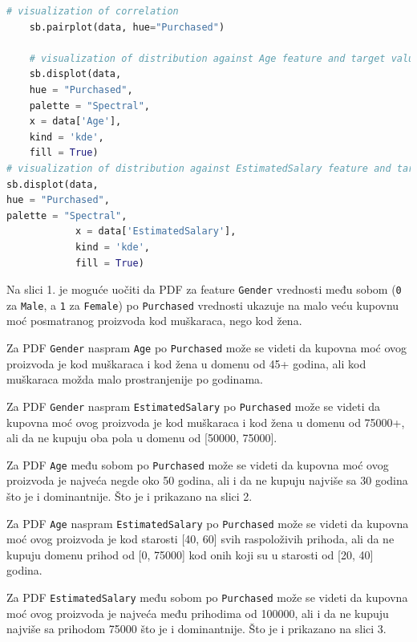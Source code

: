 \documentclass[fontsize=12bp, paper=a4]{scrarticle}
\begin{document}
\begin{lstlisting}[language=Python, caption=Navođenje načina vizuelizacija za sliku \texttt{1., 2. i 3.}]
    # visualization of correlation
    sb.pairplot(data, hue="Purchased")

    # visualization of distribution against Age feature and target value
    sb.displot(data, 
    hue = "Purchased", 
    palette = "Spectral",
    x = data['Age'],
    kind = 'kde',
    fill = True)
# visualization of distribution against EstimatedSalary feature and target value
sb.displot(data, 
hue = "Purchased", 
palette = "Spectral",
			x = data['EstimatedSalary'],
			kind = 'kde',
			fill = True)
\end{lstlisting}

Na slici 1. je moguće uočiti da PDF za feature \verb*|Gender| vrednosti među sobom (\verb|0| za \verb|Male|, a \verb*|1| za \verb*|Female|) po \verb*|Purchased| vrednosti ukazuje na malo veću kupovnu moć posmatranog proizvoda kod muškaraca, nego kod žena.

Za PDF \verb*|Gender| naspram \verb*|Age| po \verb|Purchased| može se videti da kupovna moć ovog proizvoda je kod muškaraca i kod žena u domenu od 45+ godina, ali kod muškaraca možda malo prostranjenije po godinama.

Za PDF \verb*|Gender| naspram \verb*|EstimatedSalary| po \verb|Purchased| može se videti da kupovna moć ovog proizvoda je kod muškaraca i kod žena u domenu od 75000+, ali da ne kupuju oba pola u domenu od [50000, 75000].

Za PDF \verb*|Age| među sobom po \verb|Purchased| može se videti da kupovna moć ovog proizvoda je najveća negde oko 50 godina, ali i da ne kupuju najviše sa 30 godina što je i dominantnije. Što je i prikazano na slici 2.

Za PDF \verb*|Age| naspram \verb*|EstimatedSalary| po \verb|Purchased| može se videti da kupovna moć ovog proizvoda je kod starosti [40, 60] svih raspoloživih prihoda, ali da ne kupuju domenu prihod od [0, 75000] kod onih koji su u starosti od [20, 40] godina.

Za PDF \verb*|EstimatedSalary| među sobom po \verb|Purchased| može se videti da kupovna moć ovog proizvoda je najveća među prihodima od 100000, ali i da ne kupuju najviše sa prihodom 75000 što je i dominantnije. Što je i prikazano na slici 3.
\end{document}
